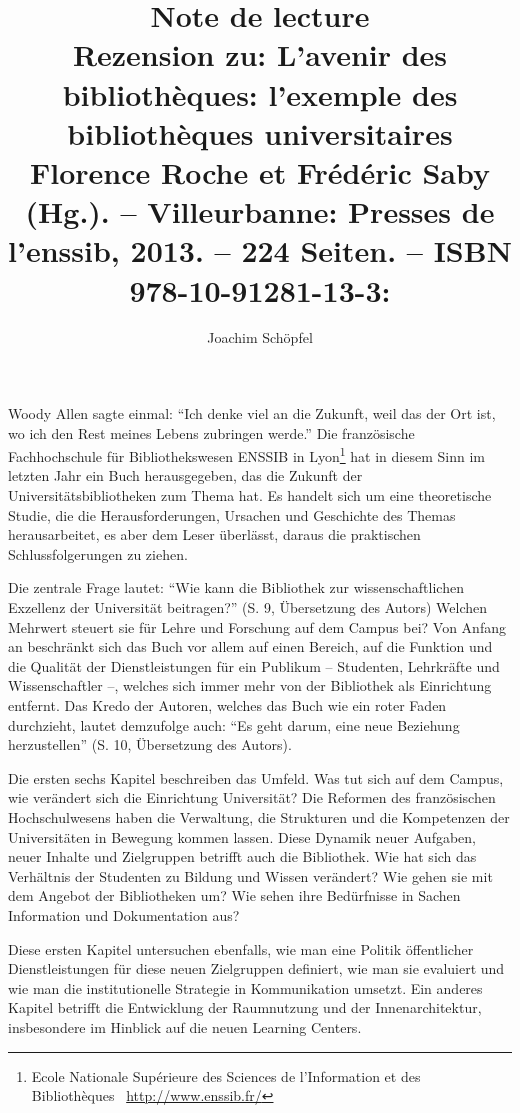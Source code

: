 \documentclass[a4paper,
fontsize=11pt,
oneside,
numbers=noperiodatend,
parskip=half-,
bibliography=totoc,
final
]{scrartcl}
\title{\LARGE{Note de lecture} \\ \large{Rezension zu: L’avenir des bibliothèques: l’exemple des bibliothèques
universitaires \/ Florence Roche et Frédéric Saby (Hg.). – Villeurbanne:
Presses de l’enssib, 2013. – 224 Seiten. – ISBN 978-10-91281-13-3: \EUR{34}}} %
\author{Joachim Schöpfel} %
\date{}
\begin{document}
\maketitle
\thispagestyle{fancyplain} 





Woody Allen sagte einmal: \enquote{Ich denke viel an die Zukunft, weil
das der Ort ist, wo ich den Rest meines Lebens zubringen werde.} Die
französische Fachhochschule für Bibliothekswesen ENSSIB in
Lyon\footnote{Ecole Nationale Supérieure des Sciences de l'Information
  et des Bibliothèques~ \url{http://www.enssib.fr/}} hat in diesem Sinn
im letzten Jahr ein Buch herausgegeben, das die Zukunft der
Universitätsbibliotheken zum Thema hat. Es handelt sich um eine
theoretische Studie, die die Herausforderungen, Ursachen und Geschichte
des Themas herausarbeitet, es aber dem Leser überlässt, daraus die
praktischen Schlussfolgerungen zu ziehen.

Die zentrale Frage lautet: \enquote{Wie kann die Bibliothek zur
wissenschaftlichen Exzellenz der Universität beitragen?} (S. 9,
Übersetzung des Autors) Welchen Mehrwert steuert sie für Lehre und
Forschung auf dem Campus bei? Von Anfang an beschränkt sich das Buch vor
allem auf einen Bereich, auf die Funktion und die Qualität der
Dienstleistungen für ein Publikum -- Studenten, Lehrkräfte und
Wissenschaftler --, welches sich immer mehr von der Bibliothek als
Einrichtung entfernt. Das Kredo der Autoren, welches das Buch wie ein
roter Faden durchzieht, lautet demzufolge auch: \enquote{Es geht darum,
eine neue Beziehung herzustellen} (S. 10, Übersetzung des Autors).

Die ersten sechs Kapitel beschreiben das Umfeld. Was tut sich auf dem
Campus, wie verändert sich die Einrichtung Universität? Die Reformen des
französischen Hochschulwesens haben die Verwaltung, die Strukturen und
die Kompetenzen der Universitäten in Bewegung kommen lassen. Diese
Dynamik neuer Aufgaben, neuer Inhalte und Zielgruppen betrifft auch die
Bibliothek. Wie hat sich das Verhältnis der Studenten zu Bildung und
Wissen verändert? Wie gehen sie mit dem Angebot der Bibliotheken um? Wie
sehen ihre Bedürfnisse in Sachen Information und Dokumentation aus?

Diese ersten Kapitel untersuchen ebenfalls, wie man eine Politik
öffentlicher Dienstleistungen für diese neuen Zielgruppen definiert, wie
man sie evaluiert und wie man die institutionelle Strategie in
Kommunikation umsetzt. Ein anderes Kapitel betrifft die Entwicklung der
Raumnutzung und der Innenarchitektur, insbesondere im Hinblick auf die
neuen Learning Centers.
\end{document}
